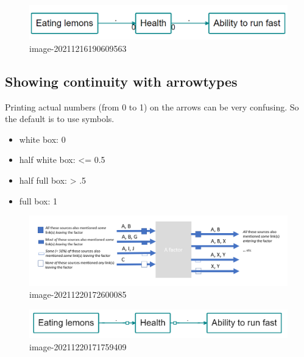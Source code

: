 \documentclass[
]{book}
\providecommand{\tightlist}{%
  \setlength{\itemsep}{0pt}\setlength{\parskip}{0pt}}
\begin{document}
\begin{figure}
\centering
\includegraphics[width=6.77083in,height=\textheight]{_assets/image-20211216190609563.png}
\caption{image-20211216190609563}
\end{figure}

\hypertarget{showing-continuity-with-arrowtypes}{%
\subsection{Showing continuity with arrowtypes}\label{showing-continuity-with-arrowtypes}}

Printing actual numbers (from 0 to 1) on the arrows can be very confusing. So the default is to use symbols.

\begin{itemize}
\tightlist
\item
  white box: 0
\item
  half white box: \textless= 0.5
\item
  half full box: \textgreater{} .5
\item
  full box: 1
\end{itemize}

\begin{figure}
\centering
\includegraphics[width=6.77083in,height=\textheight]{_assets/image-20211220172600085.png}
\caption{image-20211220172600085}
\end{figure}

\begin{figure}
\centering
\includegraphics[width=6.77083in,height=\textheight]{_assets/image-20211220171759409.png}
\caption{image-20211220171759409}
\end{figure}
\end{document}
